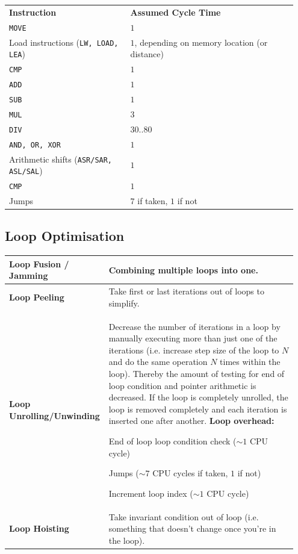 		\begin{longtable}{|p{0.4\linewidth}|p{0.55\linewidth}|}
				\hline
				\textbf{Instruction}
					& \textbf{Assumed Cycle Time}\\
				\hhline{|=|=|}
				\texttt{MOVE}
					& $1$\\
				\hline
				Load instructions (\texttt{LW, LOAD, LEA})
					& $1$, depending on memory location (or distance)\\
				\hline
				\texttt{CMP}
					& $1$\\
				\hline
				\texttt{ADD}
					& $1$\\
				\hline
				\texttt{SUB}
					& $1$\\
				\hline
				\texttt{MUL}
					& $3$\\
				\hline
				\texttt{DIV}
					& $30..80$\\
				\hline
				\texttt{AND, OR, XOR}
					& $1$\\
				\hline
				Arithmetic shifts (\texttt{ASR/SAR, ASL/SAL})
					& $1$\\
				\hline
				\texttt{CMP}
					& $1$\\
				\hline
				Jumps 
					& $7$ if taken, $1$ if not\\
				\hline
		\end{longtable}
	
	\subsection{Loop Optimisation }				
			\begin{longtable}{|>{\bfseries}p{0.3\linewidth}|p{0.65\linewidth}|}
					\hline					
					Loop Fusion / Jamming
						& Combining multiple loops into one.\\
					\hline
					Loop Peeling
						& Take first or last iterations out of loops to simplify.\\
					\hline					
					Loop Unrolling/Unwinding
					& Decrease the number of iterations in a loop by manually executing more than just one of the iterations (i.e. increase step size of the loop to $N$ and do the same operation $N$ times within the loop). Thereby the amount of testing for end of loop condition and pointer arithmetic is decreased. If the loop is completely unrolled, the loop is removed completely and each iteration is inserted one after another.\newline
					\textbf{Loop overhead:}
					\begin{compactitem}
						\item End of loop loop condition check ($\sim 1$ CPU cycle)
						\item Jumps ($\sim 7$ CPU cycles if taken, $1$ if not)
						\item Increment loop index ($\sim 1$ CPU cycle)
					\end{compactitem} \\[-\normalbaselineskip]
					\hline
					Loop Hoisting
					& Take invariant condition out of loop (i.e. something that doesn't change once you're in the loop).\\
					\hline
			\end{longtable}
		
